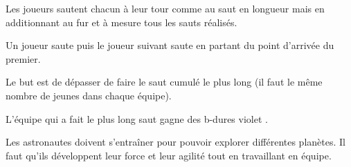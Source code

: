 \documentclass{grand-jeu}
\begin{document}
\begin{liste-materiel}
\end{liste-materiel}

\begin{regles}
Les joueurs sautent chacun à leur tour comme au saut en longueur mais en additionnant au fur et à mesure tous les sauts réalisés. 

Un joueur saute puis le joueur suivant saute en partant du point d'arrivée du premier. 

Le but est de dépasser de faire le saut cumulé le plus long (il faut le même nombre de jeunes dans chaque équipe). 

L'équipe qui a fait le plus long saut gagne des b-dures violet .
\end{regles}

\begin{imaginaire}
Les astronautes doivent s'entraîner pour pouvoir explorer différentes planètes. Il faut qu'ils développent leur force et leur agilité tout en travaillant en équipe. 
\end{imaginaire}

\begin{moments-stop}
\end{moments-stop}
\end{document}

